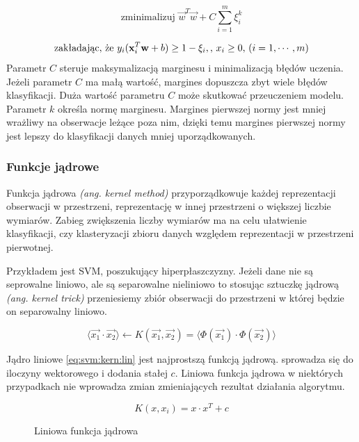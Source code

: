 \documentclass[a4paper,12pt,twoside,openany]{report}
\newcommand{\ang}[1]{\textit{(ang. #1)}}
\begin{document}
\begin{enumerate}
\begin{equation}
\mbox{zminimalizuj } {\vec w}^T {\vec w}+C\sum_{i=1}^m \xi_i^k
\end{equation}

\begin{equation}
	\mbox{zakładając, że }  y_i ({\bf x}_i^T {\bf w}+b) \ge 1-\xi_i,
	\mbox{, }x_i \ge 0 \mbox{, }(i=1,\cdots,m)
\end{equation}
Parametr $C$ steruje maksymalizacją marginesu i minimalizacją błędów uczenia.
Jeżeli parametr $C$ ma małą wartość, margines dopuszcza zbyt wiele błędów klasyfikacji.
Duża wartość parametru $C$ może skutkować przeuczeniem modelu.
Parametr $k$ określa normę marginesu. 
Margines pierwszej normy jest mniej wrażliwy na obserwacje leżące poza nim,
dzięki temu margines pierwszej normy jest lepszy do klasyfikacji danych mniej uporządkowanych.

\subsubsection{Funkcje jądrowe}
Funkcja jądrowa \ang{kernel method} 
przyporządkowuje każdej reprezentacji obserwacji w przestrzeni,
reprezentację w innej przestrzeni o większej liczbie wymiarów.
Zabieg zwiększenia liczby wymiarów ma na celu ułatwienie 
klasyfikacji, czy klasteryzacji zbioru danych względem
reprezentacji w przestrzeni pierwotnej. 

Przykładem jest SVM, poszukujący hiperpłaszczyzny.
Jeżeli dane nie są seprowalne liniowo,
ale są separowalne nieliniowo to stosując sztuczkę jądrową \ang{kernel trick} 
przeniesiemy zbiór obserwacji do przestrzeni w której będzie on separowalny liniowo.
\cite{Patle2013}

\begin{equation}
	\langle \vec{x_1} \cdot \vec{x_2} \rangle \gets K(\vec{x_1}, \vec{x_2}) = \langle \Phi(\vec{x_1}) \cdot \Phi(\vec{x_2}) \rangle
\end{equation}

Jądro liniowe \ref{eq:svm:kern:lin} jest najprostszą funkcją jądrową. 
sprowadza się do iloczyny wektorowego i dodania stałej $c$.
Liniowa funkcja jądrowa w niektórych przypadkach nie wprowadza zmian zmieniających rezultat działania algorytmu.
\begin{figure}[hc]
	\begin{equation}
		\label{eq:svm:kern:lin}
		K(x, x_i) = x \cdot x ^ T + c
	\end{equation}
	\caption{Liniowa funkcja jądrowa}
\end{figure}


\end{enumerate}
\end{document}

